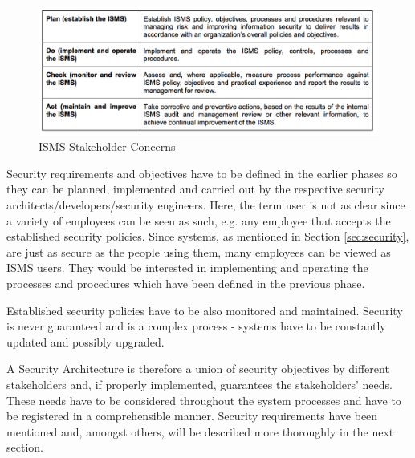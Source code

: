 \begin{figure}[H]
\centering
\includegraphics[width=\textwidth]{pictures/isms_concerns.png}
\caption{ISMS Stakeholder Concerns}
\label{fig:isms_stakeholder}
\end{figure}

Security requirements and objectives have to be defined in the earlier phases so they can be planned, implemented and carried out by the respective security architects/developers/security engineers. Here, the term user is not as clear since a variety of employees can be seen as such, e.g. any employee that accepts the established security policies. Since systems, as mentioned in Section \ref{sec:security}, are just as secure as the people using them, many employees can be viewed as ISMS users. They would be interested in implementing and operating the processes and procedures which have been defined in the previous phase.

Established security policies have to be also monitored and maintained. Security is never guaranteed and is a complex process \cite{vacca2012computer} - systems have to be constantly updated and possibly upgraded. 

A Security Architecture is therefore a union of security objectives by different stakeholders and, if properly implemented, guarantees the stakeholders' needs.
These needs have to be considered throughout the system processes and have to be registered in a comprehensible manner. Security requirements have been mentioned and, amongst others, will be described more thoroughly in the next section.

